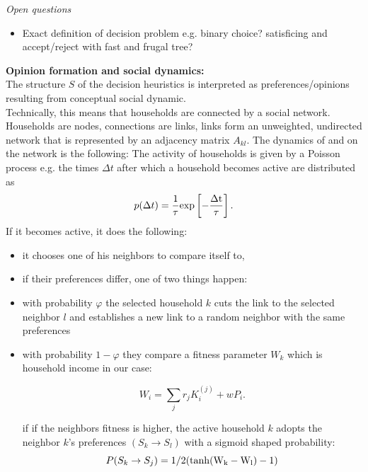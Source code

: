 \textit{Open questions}
\begin{itemize}
	\item Exact definition of decision problem e.g. binary choice? satisficing and accept/reject with fast and frugal tree?
\end{itemize}

\textbf{Opinion formation and social dynamics:} \\
The structure $S$ of the decision heuristics is interpreted as preferences/opinions resulting from conceptual social dynamic. \\
Technically, this means that households are connected by a social network. Households are nodes, connections are links, links form an unweighted, undirected network that is represented by an adjacency matrix $A_{kl}$.
The dynamics of and on the network is the following:
The activity of households is given by a Poisson process e.g. the times $\Delta t$ after which a household becomes active are distributed as
\begin{equation}
	p(\Delta t) = \frac{1}{\tau} \rm{exp}\left[-\frac{\Delta t}{\tau} \right].
	\label{waiting_time_distribution}
\end{equation}
If it becomes active, it does the following:
\begin{itemize}
	\item it chooses one of his neighbors to compare itself to,
	\item if their preferences differ, one of two things happen:
	\item with probability $\varphi$ the selected household $k$ cuts
		the link to the selected neighbor $l$ and establishes a new
		link to a random neighbor with the same preferences
	\item with probability $1-\varphi$ they compare a fitness parameter $W_k$
		which is household income in our case: 

		\begin{equation}
			W_i = \sum_j r_j K^{(j)}_{i} + wP_i.
			\label{eq:fitness}
		\end{equation}

		if if the neighbors fitness is higher, the active household $k$
		adopts the neighbor $k$'s preferences $(S_k \rightarrow S_l)$ with a sigmoid shaped 
		probability:
		\begin{equation}
			P(S_k \rightarrow S_j) = 1/2 (\rm{tanh}(W_k - W_l)-1)
			\label{imitation_probability}
		\end{equation}
\end{itemize}

